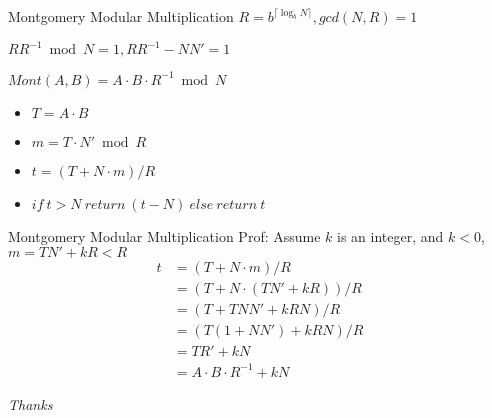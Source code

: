 \documentclass{beamer}
\begin{document}
\begin{frame}{Montgomery Modular Multiplication}
$R = b^{\lceil \log_b N \rceil},  gcd(N,R)=1$

$RR^{-1} \bmod N = 1, RR^{-1} - NN' = 1$

\hspace*{\fill}

	$Mont(A,B) = A \cdot B \cdot R^{-1} \bmod N$

	\begin{itemize}
	\item $T = A \cdot B$
	\item $m =  T \cdot N' \bmod R$ 
    \item $t = (T + N\cdot m)/R$
    \item $if \ t>N \ return \ (t-N)\  else \  return \ t$
\end{itemize}
\end{frame}

\begin{frame}{Montgomery Modular Multiplication}
Prof: Assume $k$ is an integer, and $k < 0$, $m = TN'+kR < R$ 
	\begin{equation}\nonumber
		\begin{aligned}
		t &= (T + N\cdot m)/R \\
		&= (T + N\cdot(TN'+kR)) / R \\
		&= (T + TNN' + kRN)/R \\
		&= (T(1+NN')+kRN)/R\\
		&= TR' + kN \\
		&= A \cdot B \cdot R^{-1} + kN
\end{aligned}
	\end{equation}
\end{frame}


\begin{frame}{}
  \centering \Large
	\emph{Thanks}
\end{frame}
\end{document}

